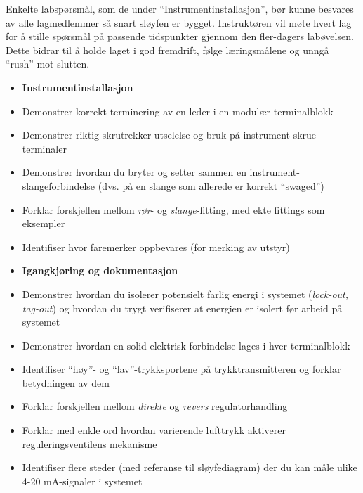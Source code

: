 Enkelte labspørsmål, som de under ``Instrumentinstallasjon'', bør kunne besvares av alle lagmedlemmer så snart sløyfen er bygget.  Instruktøren vil møte hvert lag for å stille spørsmål på passende tidspunkter gjennom den fler-dagers labøvelsen.  Dette bidrar til å holde laget i god fremdrift, følge læringsmålene og unngå ``rush'' mot slutten.

\vskip 10pt

\begin{itemize}
\item{} {\bf Instrumentinstallasjon}
\item{} Demonstrer korrekt terminering av en leder i en modulær terminalblokk
\item{} Demonstrer riktig skrutrekker-utselelse og bruk på instrument-skrue-terminaler
\item{} Demonstrer hvordan du bryter og setter sammen en instrument-slangeforbindelse (dvs. på en slange som allerede er korrekt ``swaged'')
\item{} Forklar forskjellen mellom {\it rør}- og {\it slange}-fitting, med ekte fittings som eksempler
\item{} Identifiser hvor faremerker oppbevares (for merking av utstyr)
\end{itemize}

\filbreak

\begin{itemize}
\item{} {\bf Igangkjøring og dokumentasjon}
\item{} Demonstrer hvordan du isolerer potensielt farlig energi i systemet ({\it lock-out, tag-out}) og hvordan du trygt verifiserer at energien er isolert før arbeid på systemet
\item{} Demonstrer hvordan en solid elektrisk forbindelse lages i hver terminalblokk
\item{} Identifiser ``høy''- og ``lav''-trykksportene på trykktransmitteren og forklar betydningen av dem
\item{} Forklar forskjellen mellom {\it direkte} og {\it revers} regulatorhandling
\item{} Forklar med enkle ord hvordan varierende lufttrykk aktiverer reguleringsventilens mekanisme
\item{} Identifiser flere steder (med referanse til sløyfediagram) der du kan måle ulike 4-20 mA-signaler i systemet
\end{itemize}

\filbreak



